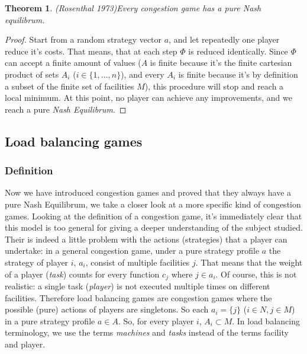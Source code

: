 \documentclass[a4paper,11pt]{article}
\newtheorem{theorem}{Theorem}[section]
\begin{document}
\begin{theorem}(Rosenthal 1973)\cite{7}\label{rosenthal}
Every congestion game has a pure Nash equilibrum.
\end{theorem}

\begin{proof}
Start from a random strategy vector $a$, and let repeatedly one player reduce it's costs. That means, that at each step $\Phi$ is reduced identically. Since $\Phi$ can accept a finite amount of values ($A$ is finite because it's the finite cartesian product of sets $A_i$ ($i \in \{1,...,n\}$), and every $A_i$ is finite because it's by definition a subset of the finite set of facilities $M$), this procedure will stop and reach a local minimum. At this point, no player can achieve any improvements, and we reach a pure \emph{Nash Equilibrum}.
\end{proof}



\subsection{Load balancing games}
\subsubsection{Definition}
Now we have introduced congestion games and proved that they always have a pure Nash Equilibrum, we take a closer look at a more specific kind of congestion games. Looking at the definition of a congestion game, it's immediately clear that this model is too general for giving a deeper understanding of the subject studied. Their is indeed a little problem with the actions (strategies) that a player can undertake: in a general congestion game, under a pure strategy profile $a$ the strategy of player $i$, $a_i$, consist of multiple facilities $j$. That means that the weight of a player (\emph{task}) counts for every function $c_j$ where $j \in a_i$. Of course, this is not realistic: a single task (\emph{player}) is not executed multiple times on different facilities. Therefore load balancing games are congestion games where the possible (pure) actions of players are singletons. So each $a_i = \{j\}$ ($i \in N, j \in M$) in a pure strategy profile $a \in A$. So, for every player $i$, $A_i \subset M$. In load balancing terminology, we use the terms \emph{machines} and \emph{tasks} instead of the terms facility and player.
\end{document}
